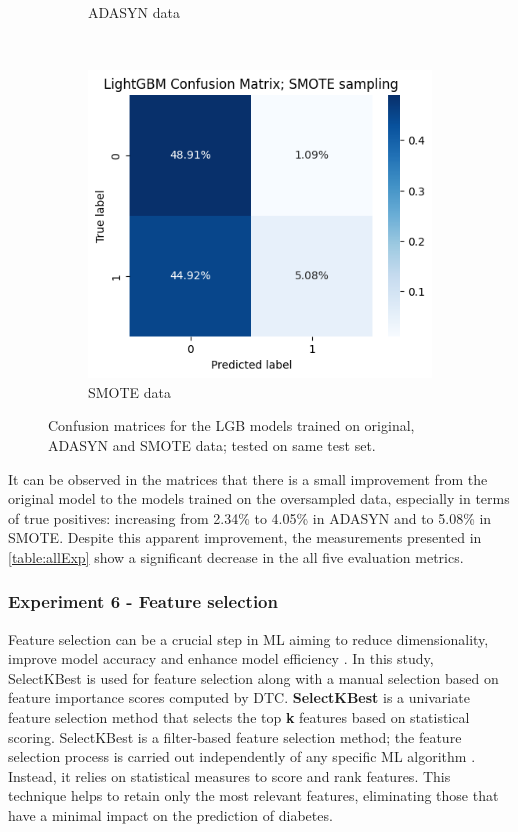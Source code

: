 \documentclass[runningheads]{llncs}
\begin{document}
\begin{figure}[htbp]
\begin{subfigure}[t]{0.3\textwidth}
        \caption{ADASYN data}
        \label{Fig:exp2_matrix_adasyn}
    \end{subfigure}
    ~ 
    \begin{subfigure}[t]{0.3\textwidth}
        \centering
        \includegraphics[width=0.99\linewidth]{images/exp2_matrix_smote.png}
        \caption{SMOTE data}
        \label{Fig:exp2_matrix_smote}
    \end{subfigure}
    \caption{Confusion matrices for the LGB models trained on original, ADASYN and SMOTE data; tested on same test set.}
    \label{fig:exp2_matrices}
\end{figure}


It can be observed in the matrices that there is a small improvement from the original model to the models trained on the oversampled data, especially in terms of true positives: increasing from 2.34\% to 4.05\%  in ADASYN and to 5.08\% in SMOTE. Despite this apparent improvement, the measurements presented in \autoref{table:allExp} show a significant decrease in the all five evaluation metrics.


\subsubsection{Experiment 6 - Feature selection}
\label{section:exp_6}
Feature selection can be a crucial step in ML aiming to reduce dimensionality, improve model accuracy and enhance model efficiency \cite{BARBIERI2024123667}. In this study, SelectKBest is used for feature selection along with a manual selection based on feature importance scores computed by DTC. \textbf {SelectKBest} is a univariate feature selection method that selects the top \textbf{k} features based on statistical scoring.  SelectKBest is a filter-based feature selection method; the feature selection process is carried out independently of any specific ML algorithm \cite{selectkbest}. Instead, it relies on statistical measures to score and rank features.
This technique helps to retain only the most relevant features, eliminating those that have a minimal impact on the prediction of diabetes. 
\end{document}
